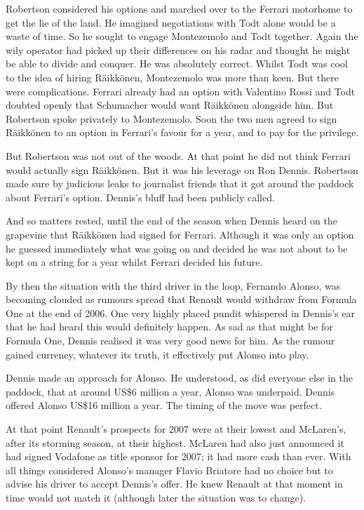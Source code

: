\documentclass{article}
\begin{document}
Robertson considered his options and marched over to the Ferrari motorhome to get the lie of the land. He imagined negotiations with Todt alone would be a waste of time. So he sought to engage Montezemolo and Todt together. Again the wily operator had picked up their differences on his radar and thought he might be able to divide and conquer. He was absolutely correct. Whilst Todt was cool to the idea of hiring Räikkönen, Montezemolo was more than keen. But there were complications. Ferrari already had an option with Valentino Rossi and Todt doubted openly that Schumacher would want Räikkönen alongside him. But Robertson spoke privately to Montezemolo. Soon the two men agreed to sign Räikkönen to an option in Ferrari’s favour for a year, and to pay for the privilege.

But Robertson was not out of the woods. At that point he did not think Ferrari would actually sign Räikkönen. But it was his leverage on Ron Dennis. Robertson made sure by judicious leaks to journalist friends that it got around the paddock about Ferrari’s option. Dennis’s bluff had been publicly called.

And so matters rested, until the end of the season when Dennis heard on the grapevine that Räikkönen had signed for Ferrari. Although it was only an option he guessed immediately what was going on and decided he was not about to be kept on a string for a year whilst Ferrari decided his future.

By then the situation with the third driver in the loop, Fernando Alonso, was becoming clouded as rumours spread that Renault would withdraw from Formula One at the end of 2006. One very highly placed pundit whispered in Dennis’s ear that he had heard this would definitely happen. As sad as that might be for Formula One, Dennis realised it was very good news for him. As the rumour gained currency, whatever its truth, it effectively put Alonso into play.

Dennis made an approach for Alonso. He understood, as did everyone else in the paddock, that at around US\$6 million a year, Alonso was underpaid. Dennis offered Alonso US\$16 million a year. The timing of the move was perfect.

At that point Renault’s prospects for 2007 were at their lowest and McLaren’s, after its storming season, at their highest. McLaren had also just announced it had signed Vodafone as title sponsor for 2007; it had more cash than ever. With all things considered Alonso’s manager Flavio Briatore had no choice but to advise his driver to accept Dennis’s offer. He knew Renault at that moment in time would not match it (although later the situation was to change).
\end{document}
